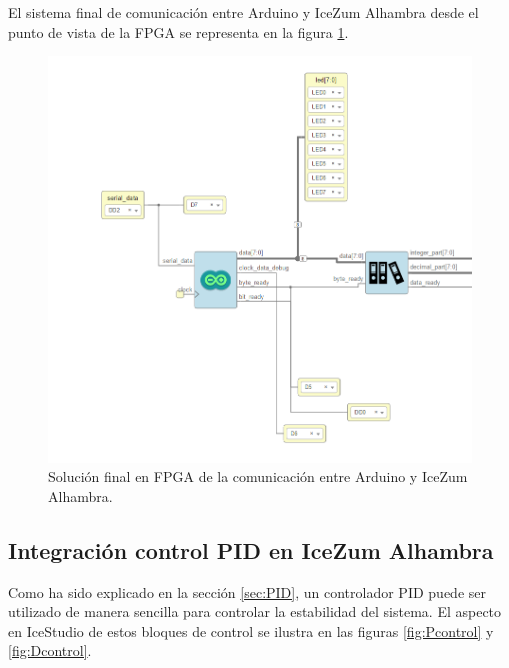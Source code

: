 El sistema final de comunicación entre Arduino y IceZum Alhambra desde el punto de vista de la FPGA se representa en la figura \ref{fig:arduino_arrange}.

\begin{figure}[H]
	\center
	\includegraphics[scale=0.6]{imagenes/Balancing_robot/arduino_arrange.PNG}
	\caption{Solución final en FPGA de la comunicación entre Arduino y IceZum Alhambra.}
	\label{fig:arduino_arrange}
\end{figure}




\subsection{Integración control PID en IceZum Alhambra}
Como ha sido explicado en la sección \ref{sec:PID}, un controlador PID puede ser utilizado de manera sencilla para controlar la estabilidad del sistema. \newline
El aspecto en IceStudio de estos bloques de control se ilustra en las figuras \ref{fig:Pcontrol} y \ref{fig:Dcontrol}.

